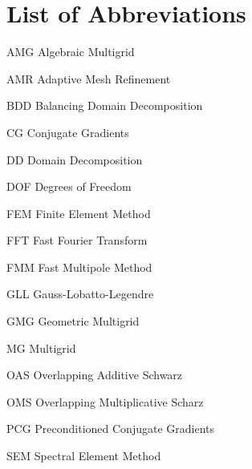 \chapter*{List of Abbreviations}

\begin{abbreviations}
\item[AMG] Algebraic Multigrid
\item[AMR] Adaptive Mesh Refinement
\item[BDD] Balancing Domain Decomposition
\item[CG] Conjugate Gradients
\item[DD] Domain Decomposition
\item[DOF] Degrees of Freedom
\item[FEM] Finite Element Method
\item[FFT] Fast Fourier Transform
\item[FMM] Fast Multipole Method
\item[GLL] Gauss-Lobatto-Legendre
\item[GMG] Geometric Multigrid
\item[MG] Multigrid
\item[OAS] Overlapping Additive Schwarz
\item[OMS] Overlapping Multiplicative Scharz
\item[PCG] Preconditioned Conjugate Gradients
\item[SEM] Spectral Element Method

\end{abbreviations}